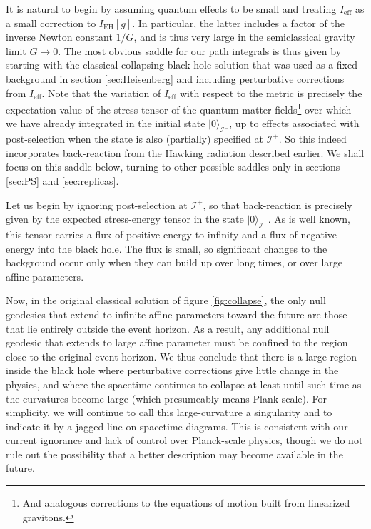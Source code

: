 \documentclass[letterpaper,12pt]{article}
\newcommand*{\scri}{\mathscr{I}} %
\begin{document}
It is natural to begin by assuming quantum effects to be small and treating $I_\text{eff}$ as a small correction to $I_\text{EH}[g]$.  In particular, the latter includes a factor of the inverse Newton constant $1/G$, and is thus very large in the semiclassical gravity limit $G \rightarrow 0$.  The most obvious saddle for our path integrals is thus given by starting with the classical collapsing black hole solution that was used as a fixed background in section \ref{sec:Heisenberg} and including perturbative corrections from $I_\text{eff}$.  Note that the variation of $I_\text{eff}$ with respect to the metric is precisely the expectation value of the stress tensor of the quantum matter fields\footnote{And analogous corrections to the equations of motion built from linearized gravitons.} over which we have already integrated in the initial state $|0\rangle_{\scri^-}$, up to effects associated with post-selection when the state is also (partially) specified at $\scri^+$.  So this indeed incorporates back-reaction from the Hawking radiation described earlier. We shall focus on this saddle below, turning to other possible saddles only in sections \ref{sec:PS} and \ref{sec:replicas}.

Let us begin by ignoring post-selection at $\scri^+$, so that back-reaction is precisely given by the expected stress-energy tensor in the state $|0\rangle_{\scri^-}$.  As is well known, this tensor carries a flux of positive energy to infinity and a flux of negative energy into the black hole.  The flux is small, so significant changes to the background occur only when they can build up over long times, or over large affine parameters.

Now, in the original classical solution of figure \ref{fig:collapse}, the only null geodesics that extend to infinite affine parameters toward the future are those that lie entirely outside the event horizon.  As a result, any additional null geodesic that extends to large affine parameter must be confined to the region close to the original event horizon.  We thus conclude that there is a large region inside the black hole where perturbative corrections give little change in the physics, and where the spacetime continues to collapse at least until such time as the curvatures become large (which presumeably means Plank scale).  For simplicity, we will continue to call this large-curvature a singularity and to indicate it by a jagged line on spacetime diagrams.  This is consistent with our current ignorance and lack of control over Planck-scale physics, though we do not rule out the possibility that a better description may become available in the future.
\end{document}
